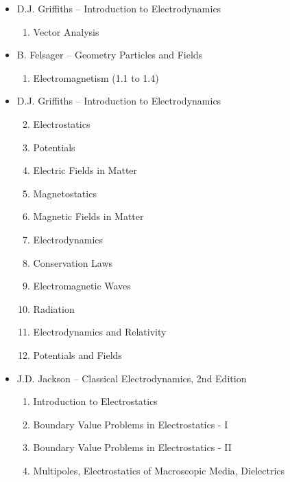\begin{itemize}

\item D.J. Griffiths -- Introduction to Electrodynamics
\begin{enumerate}
\setcounter{enumi}{0}
\item Vector Analysis
\end{enumerate}

\item B. Felsager -- Geometry Particles and Fields
\begin{enumerate}
\setcounter{enumi}{0}
\item Electromagnetism (1.1 to 1.4)
\end{enumerate}

\item D.J. Griffiths -- Introduction to Electrodynamics
\begin{enumerate}
\setcounter{enumi}{1}
\item Electrostatics
\item Potentials
\item Electric Fields in Matter
\item Magnetostatics
\item Magnetic Fields in Matter
\item Electrodynamics
\item Conservation Laws
\item Electromagnetic Waves
\item Radiation
\item Electrodynamics and Relativity
\item Potentials and Fields
\end{enumerate}

\item J.D. Jackson -- Classical Electrodynamics, 2nd Edition
\begin{enumerate}
\setcounter{enumi}{0}
\item Introduction to Electrostatics
\item Boundary Value Problems in Electrostatics - I
\item Boundary Value Problems in Electrostatics - II
\item Multipoles, Electrostatics of Macroscopic Media, Dielectrics
\end{enumerate}


\end{itemize}

